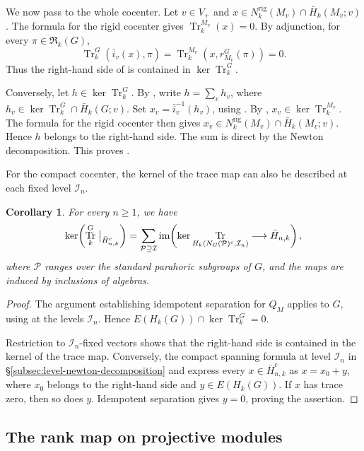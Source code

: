 \documentclass[11pt,letterpaper]{amsart}
\newtheorem{corollary}[theorem]{Corollary}
\theoremstyle{definition}
\numberwithin{equation}{section}
\numberwithin{theorem}{section}
\let\ge\geqslant
\newcommand{\kk}{k}
\newcommand{\CI}{\mathcal I}
\newcommand{\cR}{\mathfrak R}
\newcommand{\rig}{\mathrm{rig}}
\DeclareMathOperator{\Tr}{Tr}
\DeclareMathOperator{\im}{im}
\begin{document}
We now pass to the whole cocenter. Let $v\in V_+$ and
$x\in N_\kk^{\rig}(M_v)\cap\bar H_\kk(M_v;v)$.
The formula for the rigid cocenter gives $\Tr_\kk^{M_v}(x)=0$.
By adjunction, for every $\pi\in\cR_\kk(G)$,
\[
 \Tr_\kk^G(\bar i_v(x),\pi)
   =\Tr_\kk^{M_v}(x,r_{M_v}^G(\pi))=0.
\]
Thus the right-hand side of 
is contained in $\ker\Tr_\kk^G$.

Conversely, let $h\in\ker\Tr_\kk^G$.
By \cite[Theorem~6.3]{HeII}, write
$h=\sum_v h_v$, where
$h_v\in\ker\Tr_\kk^G\cap\bar H_\kk(G;v)$.
Set $x_v=\bar i_v^{-1}(h_v)$, using
.
By \cite[Corollary~6.2]{HeII},
$x_v\in\ker\Tr_\kk^{M_v}$.
The formula for the rigid cocenter then gives $x_v\in N_\kk^{\rig}(M_v)\cap\bar H_\kk(M_v;v)$.
Hence $h$ belongs to the right-hand side.
The sum is direct by the Newton decomposition.
This proves .

\smallskip

For the compact cocenter, the kernel of the trace map can also be described at each fixed level $\CI_n$.

\begin{corollary}\label{cor:compact-kernel-level}
For every $n\ge1$, we have
\[
 \ker\!\left(
   \Tr_\kk^G\bigm|_{\bar H_{n,\kk}^c}
 \right)
 =\sum_{\mathcal P\supseteq\CI}
   \im\!\left(
     \ker\Tr_{H_\kk(N_G(\mathcal P)^c,\CI_n)}
     \longrightarrow\bar H_{n,\kk}
   \right),
\]
where $\mathcal P$ ranges over the standard parahoric
subgroups of $G$, and the maps are induced by inclusions
of algebras.
\end{corollary}

\begin{proof}
The argument establishing idempotent separation for
$Q_M$ applies to $G$, using 
at the levels $\CI_n$. Hence
$E(H_\kk(G))\cap\ker\Tr_\kk^G=0$.

Restriction to $\CI_n$-fixed vectors shows that the right-hand side is contained in the kernel of the trace map.
Conversely, the compact spanning formula at level
$\CI_n$ in \S\ref{subsec:level-newton-decomposition}
and  express every
$x\in\bar H_{n,\kk}^c$ as $x=x_0+y$, where $x_0$
belongs to the right-hand side and
$y\in E(H_\kk(G))$.
If $x$ has trace zero, then so does $y$.
Idempotent separation gives $y=0$, proving the assertion.
\end{proof}

\subsection{The rank map on projective modules}\label{sec:rank}
\end{document}
